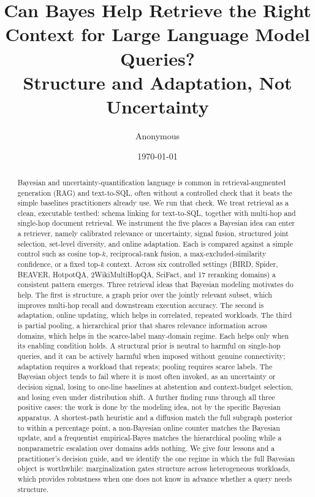 \documentclass[11pt]{article}
\title{\bf Can Bayes Help Retrieve the Right Context for Large Language Model Queries?\\
\large Structure and Adaptation, Not Uncertainty}
\author{Anonymous}
\date{\today}
\begin{document}
\maketitle

\begin{abstract}
Bayesian and uncertainty-quantification language is common in retrieval-augmented generation (RAG) and
text-to-SQL, often without a controlled check that it beats the simple baselines practitioners already
use. We run that check. We treat retrieval as a clean, executable testbed: schema linking for
text-to-SQL, together with multi-hop and single-hop document retrieval. We instrument the five places a
Bayesian idea can enter a retriever, namely calibrated relevance or uncertainty, signal fusion,
structured joint selection, set-level diversity, and online adaptation. Each is compared against a
simple control such as cosine top-$k$, reciprocal-rank fusion, a max-excluded-similarity confidence, or
a fixed top-$k$ context. Across six controlled settings (BIRD, Spider, BEAVER, HotpotQA,
2WikiMultiHopQA, SciFact, and 17 reranking domains) a consistent pattern emerges. Three retrieval ideas
that Bayesian modeling motivates do help. The first is structure, a graph prior over the jointly
relevant subset, which improves multi-hop recall and downstream execution accuracy. The second is
adaptation, online updating, which helps in correlated, repeated workloads. The third is partial
pooling, a hierarchical prior that shares relevance information across domains, which helps in the
scarce-label many-domain regime. Each helps only when its enabling condition holds. A structural prior
is neutral to harmful on single-hop queries, and it can be actively harmful when imposed without genuine
connectivity; adaptation requires a workload that repeats; pooling requires scarce labels. The Bayesian
object tends to fail where it is most often invoked, as an uncertainty or decision signal, losing to
one-line baselines at abstention and context-budget selection, and losing even under distribution shift.
A further finding runs through all three positive cases: the work is done by the modeling idea, not by
the specific Bayesian apparatus. A shortest-path heuristic and a diffusion match the full subgraph
posterior to within a percentage point, a non-Bayesian online counter matches the Bayesian update, and a
frequentist empirical-Bayes matches the hierarchical pooling while a nonparametric escalation over
domains adds nothing. We give four lessons and a practitioner's
decision guide, and we identify the one regime in which the full Bayesian object is worthwhile:
marginalization gates structure across heterogeneous workloads, which provides robustness when one does
not know in advance whether a query needs structure.
\end{abstract}
\end{document}
